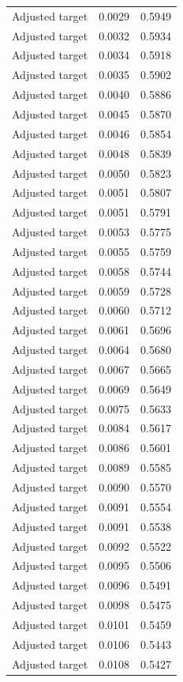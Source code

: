 \begin{table}[htbp]
\begin{tabular}{lll}
Adjusted target & 0.0029 & 0.5949 \\
Adjusted target & 0.0032 & 0.5934 \\
Adjusted target & 0.0034 & 0.5918 \\
Adjusted target & 0.0035 & 0.5902 \\
Adjusted target & 0.0040 & 0.5886 \\
Adjusted target & 0.0045 & 0.5870 \\
Adjusted target & 0.0046 & 0.5854 \\
Adjusted target & 0.0048 & 0.5839 \\
Adjusted target & 0.0050 & 0.5823 \\
Adjusted target & 0.0051 & 0.5807 \\
Adjusted target & 0.0051 & 0.5791 \\
Adjusted target & 0.0053 & 0.5775 \\
Adjusted target & 0.0055 & 0.5759 \\
Adjusted target & 0.0058 & 0.5744 \\
Adjusted target & 0.0059 & 0.5728 \\
Adjusted target & 0.0060 & 0.5712 \\
Adjusted target & 0.0061 & 0.5696 \\
Adjusted target & 0.0064 & 0.5680 \\
Adjusted target & 0.0067 & 0.5665 \\
Adjusted target & 0.0069 & 0.5649 \\
Adjusted target & 0.0075 & 0.5633 \\
Adjusted target & 0.0084 & 0.5617 \\
Adjusted target & 0.0086 & 0.5601 \\
Adjusted target & 0.0089 & 0.5585 \\
Adjusted target & 0.0090 & 0.5570 \\
Adjusted target & 0.0091 & 0.5554 \\
Adjusted target & 0.0091 & 0.5538 \\
Adjusted target & 0.0092 & 0.5522 \\
Adjusted target & 0.0095 & 0.5506 \\
Adjusted target & 0.0096 & 0.5491 \\
Adjusted target & 0.0098 & 0.5475 \\
Adjusted target & 0.0101 & 0.5459 \\
Adjusted target & 0.0106 & 0.5443 \\
Adjusted target & 0.0108 & 0.5427 \\

\end{tabular}
\end{table}
